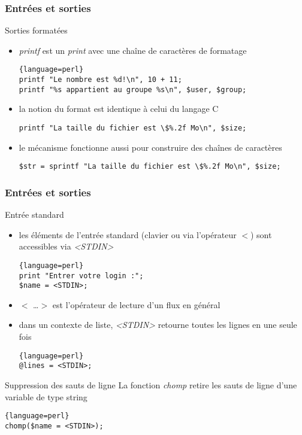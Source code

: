 \begin{frame}[fragile]
  \frametitle{Entrées et sorties}

  \begin{block}{Sorties formatées}
    \begin{itemize}
    \item \textit{printf} est un \textit{print} avec une chaîne de caractères
      de formatage
      \begin{lstlisting}{language=perl}
printf "Le nombre est %d!\n", 10 + 11;
printf "%s appartient au groupe %s\n", $user, $group;
      \end{lstlisting}
    \item la notion du format est identique à celui du langage C
      \begin{lstlisting}
printf "La taille du fichier est \$%.2f Mo\n", $size;
      \end{lstlisting}
    \item le mécanisme fonctionne aussi pour construire des chaînes de
      caractères
      \begin{lstlisting}
$str = sprintf "La taille du fichier est \$%.2f Mo\n", $size;
      \end{lstlisting}
    \end{itemize}
  \end{block}

\end{frame}

\begin{frame}[fragile]
  \frametitle{Entrées et sorties}

  \begin{block}{Entrée standard}
    \begin{itemize}
    \item les éléments de l'entrée standard (clavier ou via l'opérateur $<$)
      sont accessibles via \textit{<STDIN>}
      \begin{lstlisting}{language=perl}
print "Entrer votre login :";
$name = <STDIN>;
      \end{lstlisting}
    \item $<$ \ldots $>$ est l'opérateur de lecture d'un flux en général
    \item dans un contexte de liste, \textit{<STDIN>} retourne toutes les lignes
      en une seule fois
      \begin{lstlisting}{language=perl}
@lines = <STDIN>;
      \end{lstlisting}
    \end{itemize}
  \end{block}

  \begin{alertblock}{Suppression des sauts de ligne}
    La fonction \textit{chomp} retire les sauts de ligne d'une variable de type
    string
    \begin{lstlisting}{language=perl}
chomp($name = <STDIN>);
    \end{lstlisting}
  \end{alertblock}

\end{frame}

